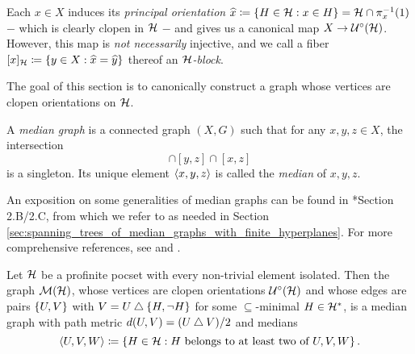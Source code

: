 \documentclass{amsart}
\begin{document}
    \begin{example}
        Each $x\in X$ induces its \textit{principal orientation} $\widehat{x}\coloneqq\left\{H\in\mathcal{H}: x\in H\right\}=\mathcal{H}\cap\pi^{-1}_x(1)$ $-$ which is clearly clopen in $\mathcal{H}$ $-$ and gives us a canonical map $X\to\mathcal{U}^\circ(\mathcal{H})$. However, this map is \textit{not necessarily} injective, and we call a fiber $[x]_{\mathcal{H}}\coloneqq\left\{y\in X:\widehat{x}=\widehat{y}\right\}$ thereof an \textit{$\mathcal{H}$-block}.
    \end{example}

    The goal of this section is to canonically construct a graph whose vertices are clopen orientations on $\mathcal{H}$.

    \begin{definition}
        A \textit{median graph} is a connected graph $(X,G)$ such that for any $x,y,z\in X$, the intersection
        \begin{equation*}
            [x,y]\cap[y,z]\cap[x,z]
        \end{equation*}
        is a singleton. Its unique element $\left\langle x,y,z\right\rangle$ is called the \textit{median} of $x,y,z$.
    \end{definition}

    An exposition on some generalities of median graphs can be found in \cite{CPTT23}*{Section 2.B/2.C}, from which we refer to as needed in Section \ref{sec:spanning_trees_of_median_graphs_with_finite_hyperplanes}. For more comprehensive references, see \cite{Rol98} and \cite{Bow22}.

    \begin{proposition}\label{prp:construction_of_dual_median_graph}
        Let $\mathcal{H}$ be a profinite pocset with every non-trivial element isolated. Then the graph $\mathcal{M}(\mathcal{H})$, whose vertices are clopen orientations $\mathcal{U}^\circ(\mathcal{H})$ and whose edges are pairs $\left\{U,V\right\}$ with $V=U\bigtriangleup\left\{H,\lnot H\right\}$ for some $\subseteq$-minimal $H\in\mathcal{H}^\ast$, is a median graph with path metric $d(U,V)=(U\bigtriangleup V)/2$ and medians
        \begin{equation*}
            \left\langle U,V,W\right\rangle\coloneqq\left\{H\in\mathcal{H}: H\textrm{ belongs to at least two of }U,V,W\right\}.
        \end{equation*}
    \end{proposition}
\end{document}
